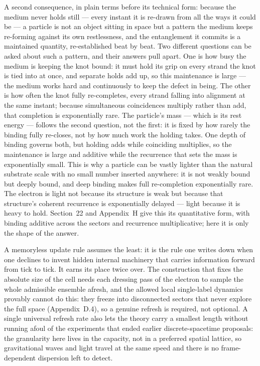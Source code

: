\documentclass[11pt]{article}
\begin{document}
A second consequence, in plain terms before its technical form: because the medium never holds still --- every instant it is re-drawn from all the ways it could be --- a particle is not an object sitting in space but a pattern the medium keeps re-forming against its own restlessness, and the entanglement it commits is a maintained quantity, re-established beat by beat. Two different questions can be asked about such a pattern, and their answers pull apart. One is how busy the medium is keeping the knot bound: it must hold its grip on every strand the knot is tied into at once, and separate holds add up, so this maintenance is large --- the medium works hard and continuously to keep the defect in being. The other is how often the knot fully re-completes, every strand falling into alignment at the same instant; because simultaneous coincidences multiply rather than add, that completion is exponentially rare. The particle's mass --- which is its rest energy --- follows the second question, not the first: it is fixed by how rarely the binding fully re-closes, not by how much work the holding takes. One depth of binding governs both, but holding adds while coinciding multiplies, so the maintenance is large and additive while the recurrence that sets the mass is exponentially small. This is why a particle can be vastly lighter than the natural substrate scale with no small number inserted anywhere: it is not weakly bound but deeply bound, and deep binding makes full re-completion exponentially rare. The electron is light not because its structure is weak but because that structure's coherent recurrence is exponentially delayed --- light because it is heavy to hold. Section~22 and Appendix~H give this its quantitative form, with binding additive across the sectors and recurrence multiplicative; here it is only the shape of the answer.

A memoryless update rule assumes the least: it is the rule one writes down when one declines to invent hidden internal machinery that carries information forward from tick to tick. It earns its place twice over. The construction that fixes the absolute size of the cell needs each dressing pass of the electron to sample the whole admissible ensemble afresh, and the allowed local single-label dynamics provably cannot do this: they freeze into disconnected sectors that never explore the full space (Appendix~D.4), so a genuine refresh is required, not optional. A single universal refresh rate also lets the theory carry a smallest length without running afoul of the experiments that ended earlier discrete-spacetime proposals: the granularity here lives in the capacity, not in a preferred spatial lattice, so gravitational waves and light travel at the same speed and there is no frame-dependent dispersion left to detect.
\end{document}
